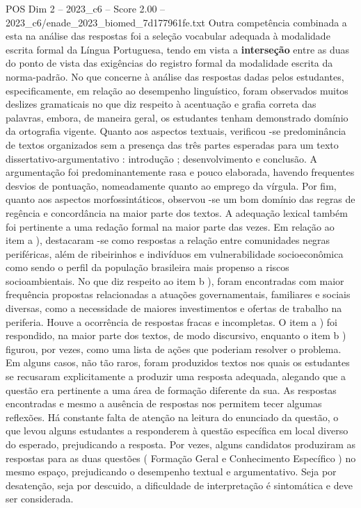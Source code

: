 \begin{textsample}{POS Dim 2 – 2023\_c6 – Score 2.00 – 2023\_c6/enade\_2023\_biomed\_7d177961fe.txt}
Outra competência combinada a esta na análise das respostas foi a seleção vocabular adequada à modalidade escrita formal da Língua Portuguesa, tendo em vista a \textbf{interseção} entre as duas do ponto de vista das exigências do registro formal da modalidade escrita da norma-padrão.
No que concerne à análise das respostas dadas pelos estudantes, especificamente, em relação ao desempenho linguístico, foram observados muitos deslizes gramaticais no que diz respeito à acentuação e grafia correta das palavras, embora, de maneira geral, os estudantes tenham demonstrado domínio da ortografia vigente.
Quanto aos aspectos textuais, verificou -se predominância de textos organizados sem a presença das três partes esperadas para um texto dissertativo-argumentativo : introdução ; desenvolvimento e conclusão.
A argumentação foi predominantemente rasa e pouco elaborada, havendo frequentes desvios de pontuação, nomeadamente quanto ao emprego da vírgula.
Por fim, quanto aos aspectos morfossintáticos, observou -se um bom domínio das regras de regência e concordância na maior parte dos textos.
A adequação lexical também foi pertinente a uma redação formal na maior parte das vezes.
Em relação ao item a ), destacaram -se como respostas a relação entre comunidades negras periféricas, além de ribeirinhos e indivíduos em vulnerabilidade socioeconômica como sendo o perfil da população brasileira mais propenso a riscos socioambientais.
No que diz respeito ao item b ), foram encontradas com maior frequência propostas relacionadas a atuações governamentais, familiares e sociais diversas, como a necessidade de maiores investimentos e ofertas de trabalho na periferia.
Houve a ocorrência de respostas fracas e incompletas.
O item a ) foi respondido, na maior parte dos textos, de modo discursivo, enquanto o item b ) figurou, por vezes, como uma lista de ações que poderiam resolver o problema.
Em alguns casos, não tão raros, foram produzidos textos nos quais os estudantes se recusaram explicitamente a produzir uma resposta adequada, alegando que a questão era pertinente a uma área de formação diferente da sua.
As respostas encontradas e mesmo a ausência de respostas nos permitem tecer algumas reflexões.
Há constante falta de atenção na leitura do enunciado da questão, o que levou alguns estudantes a responderem à questão específica em local diverso do esperado, prejudicando a resposta.
Por vezes, alguns candidatos produziram as respostas para as duas questões ( Formação Geral e Conhecimento Específico ) no mesmo espaço, prejudicando o desempenho textual e argumentativo.
Seja por desatenção, seja por descuido, a dificuldade de interpretação é sintomática e deve ser considerada.

\end{textsample}
